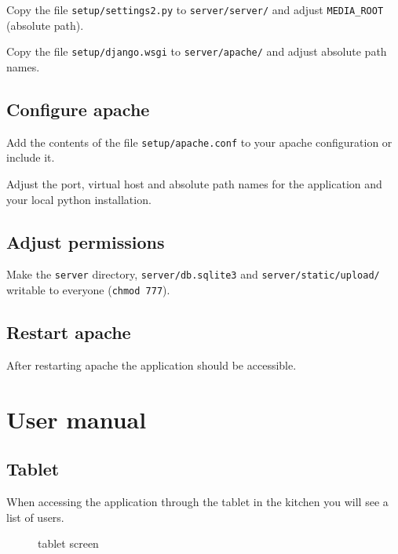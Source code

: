 Copy the file \texttt{setup/settings2.py} to \texttt{server/server/} and
adjust \texttt{MEDIA\_ROOT} (absolute path).

Copy the file \texttt{setup/django.wsgi} to \texttt{server/apache/} and
adjust absolute path names.

\subsection{Configure apache}\label{configure-apache}

Add the contents of the file \texttt{setup/apache.conf} to your apache
configuration or include it.

Adjust the port, virtual host and absolute path names for the
application and your local python installation.

\subsection{Adjust permissions}\label{adjust-permissions}

Make the \texttt{server} directory, \texttt{server/db.sqlite3} and
\texttt{server/static/upload/} writable to everyone
(\texttt{chmod\ 777}).

\subsection{Restart apache}\label{restart-apache}

After restarting apache the application should be accessible.

\newpage
\newpage
\section{User manual}\label{user-manual}

\subsection{Tablet}\label{tablet}

When accessing the application through the tablet in the kitchen you
will see a list of users.

\begin{figure}[htbp]
\centering
{}
\caption{tablet screen}
\end{figure}

